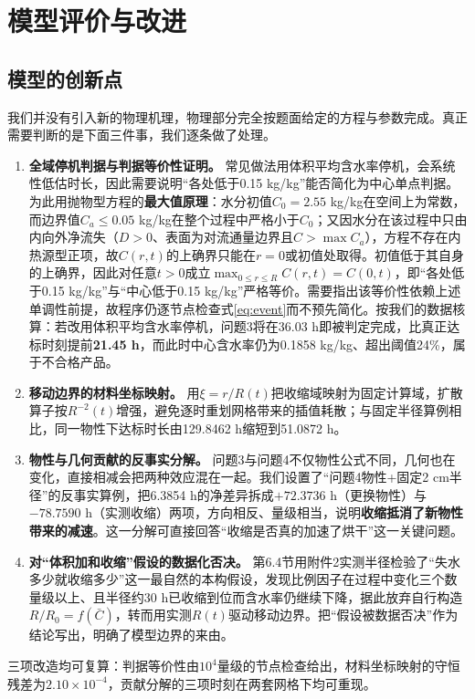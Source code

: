 \documentclass[zihao=-4,UTF8]{ctexart}
\begin{document}
\clearpage
\section{模型评价与改进}
\subsection{模型的创新点}
我们并没有引入新的物理机理，物理部分完全按题面给定的方程与参数完成。真正需要判断的是下面三件事，我们逐条做了处理。
\begin{enumerate}
\item \textbf{全域停机判据与判据等价性证明。} 常见做法用体积平均含水率停机，会系统性低估时长，因此需要说明“各处低于0.15 kg/kg”能否简化为中心单点判据。为此用抛物型方程的\textbf{最大值原理}：水分初值$C_0=2.55$ kg/kg在空间上为常数，而边界值$C_a\le0.05$ kg/kg在整个过程中严格小于$C_0$；又因水分在该过程中只由内向外净流失（$D>0$、表面为对流通量边界且$C>\max C_a$），方程不存在内热源型正项，故$C(r,t)$的上确界只能在$r=0$或初值处取得。初值低于其自身的上确界，因此对任意$t>0$成立$\max_{0\le r\le R}C(r,t)=C(0,t)$，即“各处低于0.15 kg/kg”与“中心低于0.15 kg/kg”严格等价。需要指出该等价性依赖上述单调性前提，故程序仍逐节点检查式\eqref{eq:event}而不预先简化。按我们的数据核算：若改用体积平均含水率停机，问题3将在36.03 h即被判定完成，比真正达标时刻提前\textbf{21.45 h}，而此时中心含水率仍为0.1858 kg/kg、超出阈值24\%，属于不合格产品。
\item \textbf{移动边界的材料坐标映射。} 用$\xi=r/R(t)$把收缩域映射为固定计算域，扩散算子按$R^{-2}(t)$增强，避免逐时重划网格带来的插值耗散；与固定半径算例相比，同一物性下达标时长由129.8462 h缩短到51.0872 h。
\item \textbf{物性与几何贡献的反事实分解。} 问题3与问题4不仅物性公式不同，几何也在变化，直接相减会把两种效应混在一起。我们设置了“问题4物性+固定2 cm半径”的反事实算例，把6.3854 h的净差异拆成$+72.3736$ h（更换物性）与$-78.7590$ h（实测收缩）两项，方向相反、量级相当，说明\textbf{收缩抵消了新物性带来的减速}。这一分解可直接回答“收缩是否真的加速了烘干”这一关键问题。
\item \textbf{对“体积加和收缩”假设的数据化否决。} 第6.4节用附件2实测半径检验了“失水多少就收缩多少”这一最自然的本构假设，发现比例因子在过程中变化三个数量级以上、且半径约30 h已收缩到位而含水率仍继续下降，据此放弃自行构造$R/R_0=f(\bar C)$，转而用实测$R(t)$驱动移动边界。把“假设被数据否决”作为结论写出，明确了模型边界的来由。
\end{enumerate}
三项改造均可复算：判据等价性由$10^{4}$量级的节点检查给出，材料坐标映射的守恒残差为$2.10\times10^{-4}$，贡献分解的三项时刻在两套网格下均可重现。
\end{document}

